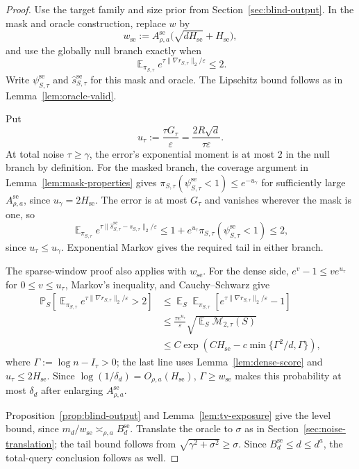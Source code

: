 \documentclass[11pt,letterpaper]{article}
\DeclareMathOperator*{\E}{\mathbb{E}}
\newcommand{\eps}{\varepsilon}
\newcommand{\1}{\mathbbm{1}}
\newcommand{\Prob}{\mathbb P}
\begin{document}
\begin{proof}
Use the target family and size prior from Section~\ref{sec:blind-output}.
In the mask and oracle construction, replace \(w\) by
\[
   w_{\mathrm{se}}:=A_{\rho,a}^{\mathrm{se}}
      \bigl(\sqrt{dH_{\mathrm{se}}}+H_{\mathrm{se}}\bigr),
\]
and use the globally null branch exactly when
\[
   \E_{\pi_{S,\tau}}
   e^{\tau\|\nabla r_{S,\tau}\|_2/\eps}\le2.
\]
Write \(\psi^{\mathrm{se}}_{S,\tau}\) and
\(\widehat s^{\mathrm{se}}_{S,\tau}\) for this mask and oracle.
The Lipschitz bound follows as in Lemma~\ref{lem:oracle-valid}.

Put
\[
   u_\tau:=\frac{\tau G_\tau}{\eps}
          =\frac{2R\sqrt d}{\tau\eps}.
\]
At total noise \(\tau\ge\gamma\), the error's exponential moment
is at most \(2\) in the null branch by definition.
For the masked branch, the coverage argument in
Lemma~\ref{lem:mask-properties} gives
\(\pi_{S,\tau}(\psi^{\mathrm{se}}_{S,\tau}<1)
\le e^{-u_\gamma}\) for sufficiently large
\(A_{\rho,a}^{\mathrm{se}}\), since \(u_\gamma=2H_{\mathrm{se}}\).
The error is at most \(G_\tau\) and vanishes wherever the mask is one, so
\[
   \E_{\pi_{S,\tau}}
      e^{\tau\|\widehat s^{\mathrm{se}}_{S,\tau}-s_{S,\tau}\|_2/\eps}
   \le1+e^{u_\tau}\pi_{S,\tau}(\psi^{\mathrm{se}}_{S,\tau}<1)
   \le2,
\]
since \(u_\tau\le u_\gamma\).
Exponential Markov gives the required tail in either branch.

The sparse-window proof also applies with \(w_{\mathrm{se}}\).
For the dense side, \(e^v-1\le ve^{u_\tau}\) for
\(0\le v\le u_\tau\), Markov's inequality, and Cauchy--Schwarz give
\[
\begin{aligned}
   \Prob_S\!\left[
      \E_{\pi_{S,\tau}}e^{\tau\|\nabla r_{S,\tau}\|_2/\eps}>2
   \right]
   &\le\E_S\E_{\pi_{S,\tau}}
      \left[e^{\tau\|\nabla r_{S,\tau}\|_2/\eps}-1\right]\\
   &\le\frac{\tau e^{u_\tau}}{\eps}
      \sqrt{\E_S\mathcal M_{2,\tau}(S)}\\
   &\le C\exp\left(C H_{\mathrm{se}}
      -c\min\{\Gamma^2/d,\Gamma\}\right),
\end{aligned}
\]
where \(\Gamma:=\log n-I_\tau>0\); the last line uses
Lemma~\ref{lem:dense-score} and \(u_\tau\le2H_{\mathrm{se}}\).
Since \(\log(1/\delta_d)=O_{\rho,a}(H_{\mathrm{se}})\),
\(\Gamma\ge w_{\mathrm{se}}\) makes this probability at most
\(\delta_d\) after enlarging \(A_{\rho,a}^{\mathrm{se}}\).

Proposition~\ref{prop:blind-output} and Lemma~\ref{lem:tv-exposure}
give the level bound, since
\(m_d/w_{\mathrm{se}}\asymp_{\rho,a}B_d^{\mathrm{se}}\).
Translate the oracle to \(\sigma\) as in
Section~\ref{sec:noise-translation}; the tail bound follows from
\(\sqrt{\gamma^2+\sigma^2}\ge\sigma\).
Since \(B_d^{\mathrm{se}}\le d\le d^a\), the total-query conclusion
follows as well.
\end{proof}
\end{document}
